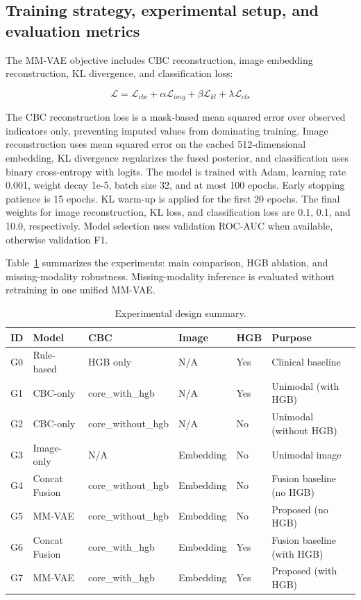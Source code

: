 \documentclass[conference,letterpaper]{IEEEtran}
\begin{document}
\subsection{Training strategy, experimental setup, and evaluation metrics}

The MM-VAE objective includes CBC reconstruction, image embedding reconstruction, KL divergence, and classification loss:

\begin{equation}
\mathcal{L}=\mathcal{L}_{cbc}+\alpha\mathcal{L}_{img}+\beta\mathcal{L}_{kl}+\lambda\mathcal{L}_{cls}
\label{eq:loss}
\end{equation}

The CBC reconstruction loss is a mask-based mean squared error over observed indicators only, preventing imputed values from dominating training. Image reconstruction uses mean squared error on the cached 512-dimensional embedding, KL divergence regularizes the fused posterior, and classification uses binary cross-entropy with logits. The model is trained with Adam, learning rate 0.001, weight decay 1e-5, batch size 32, and at most 100 epochs. Early stopping patience is 15 epochs. KL warm-up is applied for the first 20 epochs. The final weights for image reconstruction, KL loss, and classification loss are 0.1, 0.1, and 10.0, respectively. Model selection uses validation ROC-AUC when available, otherwise validation F1.

Table~\ref{tab:experiment-design} summarizes the experiments: main comparison, HGB ablation, and missing-modality robustness. Missing-modality inference is evaluated without retraining in one unified MM-VAE.

\begin{table}[t]
\caption{Experimental design summary.}
\label{tab:experiment-design}
\centering
\small
\begin{tabular}{p{}p{}p{}p{}p{}p{}}
\hline
\textbf{ID} & \textbf{Model} & \textbf{CBC} & \textbf{Image} & \textbf{HGB} & \textbf{Purpose} \\
\hline
G0 & Rule-based & HGB only & N/A & Yes & Clinical baseline \\
G1 & CBC-only & core\_with\_hgb & N/A & Yes & Unimodal (with HGB) \\
G2 & CBC-only & core\_without\_hgb & N/A & No & Unimodal (without HGB) \\
G3 & Image-only & N/A & Embedding & No & Unimodal image \\
G4 & Concat Fusion & core\_without\_hgb & Embedding & No & Fusion baseline (no HGB) \\
G5 & MM-VAE & core\_without\_hgb & Embedding & No & Proposed (no HGB) \\
G6 & Concat Fusion & core\_with\_hgb & Embedding & Yes & Fusion baseline (with HGB) \\
G7 & MM-VAE & core\_with\_hgb & Embedding & Yes & Proposed (with HGB) \\
\hline
\end{tabular}
\end{table}
\end{document}
